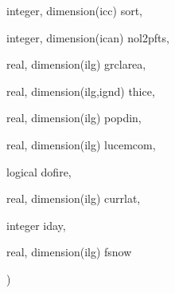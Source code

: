 {\begin{DoxyParamCaption}
\item[{integer, dimension(icc)}]{sort, }
\item[{integer, dimension(ican)}]{nol2pfts, }
\item[{real, dimension(ilg)}]{grclarea, }
\item[{real, dimension(ilg,ignd)}]{thice, }
\item[{real, dimension(ilg)}]{popdin, }
\item[{real, dimension(ilg)}]{lucemcom, }
\item[{logical}]{dofire, }
\item[{real, dimension(ilg)}]{currlat, }
\item[{integer}]{iday, }
\item[{real, dimension(ilg)}]{fsnow}
\end{DoxyParamCaption}
)}\label{group__disturbance__scheme__disturb_gae9a0c3412bfa04257e8b3a7475f4cd1d}

